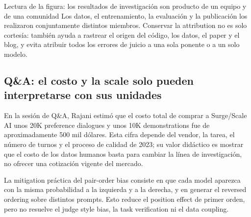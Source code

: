 
\begin{knowledgebox}{Lectura de la figura: los resultados de investigación son producto de un equipo y de una comunidad}
Los datos, el entrenamiento, la evaluación y la publicación los realizaron conjuntamente distintos miembros. Conservar la attribution no es solo cortesía: también ayuda a rastrear el origen del código, los datos, el paper y el blog, y evita atribuir todos los errores de juicio a una sola ponente o a un solo modelo.
\end{knowledgebox}

\subsection{Q\&A: el costo y la scale solo pueden interpretarse con sus unidades}

En la sesión de Q\&A, Rajani estimó que el costo total de comprar a Surge/Scale AI unos 20K preference dialogues y unos 10K demonstrations fue de aproximadamente 500 mil dólares. Esta cifra depende del vendor, la tarea, el número de turnos y el proceso de calidad de 2023; su valor didáctico es mostrar que el costo de los datos humanos basta para cambiar la línea de investigación, no ofrecer una cotización vigente del mercado.


La mitigation práctica del pair-order bias consiste en que cada model aparezca con la misma probabilidad a la izquierda y a la derecha, y en generar el reversed ordering sobre distintos prompts. Esto reduce el position effect de primer orden, pero no resuelve el judge style bias, la task verification ni el data coupling.


